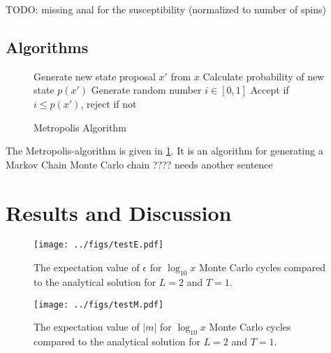 \documentclass[english,notitlepage,reprint,nofootinbib]{revtex4-1}  %
\begin{document}
TODO: missing anal for the susceptibility (normalized to number of spins)



\subsection*{Algorithms}

\begin{figure}
	\begin{algorithm}[H]
		\caption{Metropolis Algorithm}
		\label{algo:metropolis}
		\begin{algorithmic}
			\State Generate new state proposal $x'$ from $x$
			\State Calculate probability of new state $p(x')$
			\State Generate random number  $i \in [0,1]$
			\State Accept if $i \leq p(x')$, reject if not
			\EndProcedure
		\end{algorithmic}
	\end{algorithm}
\end{figure}

The Metropolis-algorithm is given in \ref{algo:metropolis}. It is an algorithm for generating a Markov Chain Monte Carlo chain ???? needs another sentence
\section{Results and Discussion}\label{sec:results}

\begin{figure}[H]
	\centering
	\texttt{[image: ../figs/testE.pdf]} %
	\caption{The expectation value of $\epsilon$ for $\log_{10} x$ Monte Carlo cycles compared to the analytical solution for $L=2$ and $T=1$.}
	\label{fig:testE}
\end{figure}

\begin{figure}[H]
	\centering
	\texttt{[image: ../figs/testM.pdf]} %
	\caption{The expectation value of $|m|$ for $\log_{10} x$ Monte Carlo cycles compared to the analytical solution for $L=2$ and $T=1$.}
	\label{fig:testM}
\end{figure}
\end{document}
